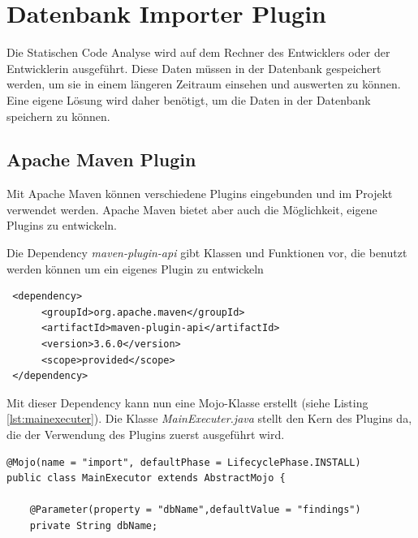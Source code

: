\section{Datenbank Importer Plugin} 
Die Statischen Code Analyse wird auf dem Rechner des Entwicklers oder der Entwicklerin ausgeführt. Diese Daten müssen in der Datenbank gespeichert werden, um sie in einem längeren Zeitraum einsehen und auswerten zu können. Eine eigene Lösung wird daher benötigt, um die Daten in der Datenbank speichern zu können. 
\subsection{Apache Maven Plugin}
Mit Apache Maven können verschiedene Plugins eingebunden und im Projekt verwendet werden. Apache Maven bietet aber auch die Möglichkeit, eigene Plugins zu entwickeln.\cite{anardu2014maven}

Die Dependency \textit{maven-plugin-api} gibt Klassen und Funktionen vor, die benutzt werden können um ein eigenes Plugin zu entwickeln
\begin{verbatim}
 <dependency>
      <groupId>org.apache.maven</groupId>
      <artifactId>maven-plugin-api</artifactId>
      <version>3.6.0</version>
      <scope>provided</scope>
 </dependency>
\end{verbatim}

Mit dieser Dependency kann nun eine Mojo-Klasse erstellt (siehe Listing  \ref{lst:mainexecuter}). Die Klasse \textit{MainExecuter.java} stellt den Kern des Plugins da, die der Verwendung des Plugins zuerst ausgeführt wird.  \cite{gonzalezMavenTutorial}

\lstset{
  caption={Kopf der Executor-Klasse: Sie wird mit dem Aufruf des Plugins zuerst gestartet.}, 
  basicstyle=\small\ttfamily, 
  label=lst:mainexecuter, 
  language=Java,
  frame=single,
  breaklines=true, %
  postbreak=\mbox{\textcolor{red}{$\hookrightarrow$}\space},
}

\begin{samepage}%
	\begin{lstlisting}[float=tbhp]
@Mojo(name = "import", defaultPhase = LifecyclePhase.INSTALL)
public class MainExecutor extends AbstractMojo {

    @Parameter(property = "dbName",defaultValue = "findings")
    private String dbName;
	\end{lstlisting}
\end{samepage}
	

